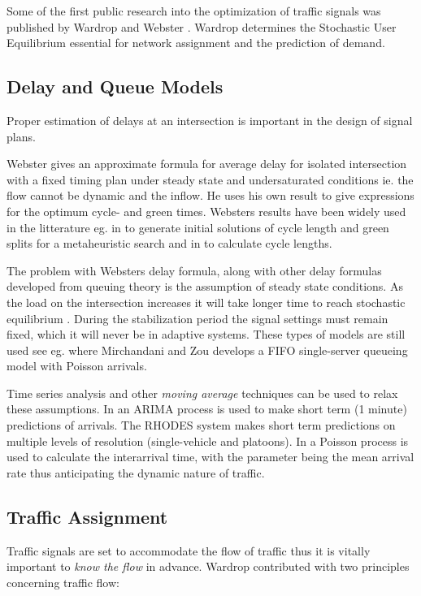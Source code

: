 \label{history}
Some of the first public research into the optimization of traffic signals was published by Wardrop \cite{Wardrop} and Webster \cite{Webster}. Wardrop determines the Stochastic User Equilibrium essential for network assignment and the prediction of demand. 

\subsection{Delay and Queue Models}
Proper estimation of delays at an intersection is important in the design of signal plans.

Webster gives an approximate formula for average delay for isolated intersection with a fixed timing plan under steady state and undersaturated conditions ie. the flow cannot be dynamic and the inflow. 
He uses his own result to give expressions for the optimum cycle- and green times. 
Websters results have been widely used in the litterature eg. in \cite{1} to generate initial solutions of cycle length and green splits for a metaheuristic search and in \cite{30} to calculate cycle lengths.

The problem with Websters delay formula, along with other delay formulas developed from queuing theory is the assumption of steady state conditions. As the load on the intersection increases it will take longer time to reach stochastic equilibrium \cite{traffictheory}. During the stabilization period the signal settings must remain fixed, which it will never be in adaptive systems. These types of models are still used see eg. \cite{38} where Mirchandani and Zou develops a FIFO single-server queueing model with Poisson arrivals.

Time series analysis and other \textit{moving average} techniques can be used to relax these assumptions. In \cite{shortpredict} an ARIMA process is used to make short term (1 minute) predictions of arrivals. The RHODES system \cite{44} makes short term predictions on multiple levels of resolution (single-vehicle and platoons). In \cite{1}                                                                                          a Poisson process is used to calculate the interarrival time, with the parameter being the mean arrival rate thus anticipating the dynamic nature of traffic.

\subsection{Traffic Assignment}
Traffic signals are set to accommodate the flow of traffic thus it is vitally important to \textit{know the flow} in advance. Wardrop contributed with two principles concerning traffic flow:

